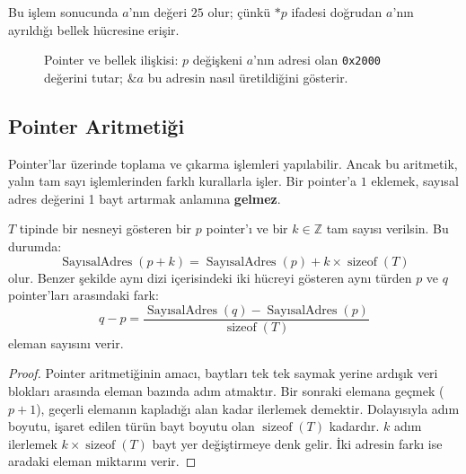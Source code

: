 Bu işlem sonucunda $a$'nın değeri $25$ olur; çünkü $*p$ ifadesi doğrudan $a$'nın ayrıldığı bellek hücresine erişir.

\begin{figure}[ht]
\centering
{}
\caption{Pointer ve bellek ilişkisi: $p$ değişkeni $a$'nın adresi olan \texttt{0x2000}
değerini tutar; $\&a$ bu adresin nasıl üretildiğini gösterir.}
\end{figure}

\subsection{Pointer Aritmetiği}

Pointer'lar üzerinde toplama ve çıkarma işlemleri yapılabilir. Ancak bu aritmetik, yalın tam sayı işlemlerinden farklı kurallarla işler. Bir pointer'a $1$ eklemek, sayısal adres değerini 1 bayt artırmak anlamına \textbf{gelmez}.

\begin{theorem}
$T$ tipinde bir nesneyi gösteren bir $p$ pointer'ı ve bir $k \in \mathbb{Z}$ tam sayısı verilsin. Bu durumda:
\[
\operatorname{SayısalAdres}(p + k) = \operatorname{SayısalAdres}(p) + k \times \operatorname{sizeof}(T)
\]
olur. Benzer şekilde aynı dizi içerisindeki iki hücreyi gösteren aynı türden $p$ ve $q$ pointer'ları arasındaki fark:
\[
q - p = \frac{\operatorname{SayısalAdres}(q) - \operatorname{SayısalAdres}(p)}{\operatorname{sizeof}(T)}
\]
eleman sayısını verir.
\end{theorem}

\begin{proof}
Pointer aritmetiğinin amacı, baytları tek tek saymak yerine ardışık veri blokları arasında eleman bazında adım atmaktır. Bir sonraki elemana geçmek ($p+1$), geçerli elemanın kapladığı alan kadar ilerlemek demektir. Dolayısıyla adım boyutu, işaret edilen türün bayt boyutu olan $\operatorname{sizeof}(T)$ kadardır. $k$ adım ilerlemek $k \times \operatorname{sizeof}(T)$ bayt yer değiştirmeye denk gelir. İki adresin farkı ise aradaki eleman miktarını verir.
\end{proof}

